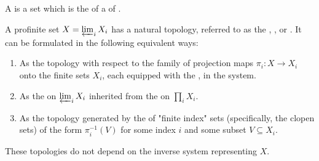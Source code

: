 \begin{definition} \label{definition:profinite_set}
A  is a set which is the  of a  of . 

A profinite set $X = \varprojlim_i X_i$ has a natural topology, referred to as the , , or . It can be formulated in the following equivalent ways:

\begin{enumerate}
    \item As the  topology with respect to the family of projection maps $\pi_i : X \to X_i$ onto the finite sets $X_i$, each equipped with the , in the system.

    \item As the  on $\varprojlim_i X_i$ inherited from the  on $\prod_i X_i$.

    \item As the topology generated by the  of "finite index" sets (specifically, the clopen sets) of the form $\pi_i^{-1}(V)$ for some index $i$ and some subset $V \subseteq X_i$.
\end{enumerate}
These topologies do not depend on the inverse system representing $X$. 
\end{definition}